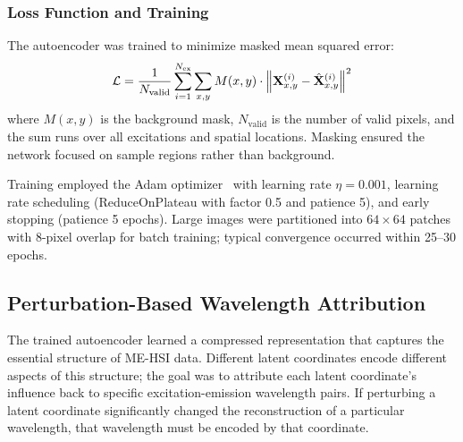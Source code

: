 \subsubsection{Loss Function and Training}
The autoencoder was trained to minimize masked mean squared error:
\begin{equation}
\mathcal{L} = \frac{1}{N_{\text{valid}}} \sum_{i=1}^{N_{\text{ex}}} \sum_{x,y} M(x,y) \cdot \left\| \mathbf{X}^{(i)}_{x,y} - \hat{\mathbf{X}}^{(i)}_{x,y} \right\|^2
\label{eq:loss}
\end{equation}
where $M(x,y)$ is the background mask, $N_{\text{valid}}$ is the number of valid pixels, and the sum runs over all excitations and spatial locations.
Masking ensured the network focused on sample regions rather than background.

Training employed the Adam optimizer~\cite{kingma2014adam} with learning rate $\eta = 0.001$, learning rate scheduling (ReduceOnPlateau with factor 0.5 and patience 5), and early stopping (patience 5 epochs).
Large images were partitioned into $64 \times 64$ patches with 8-pixel overlap for batch training; typical convergence occurred within 25--30 epochs.

\subsection{Perturbation-Based Wavelength Attribution}
\label{sec:perturbation}

The trained autoencoder learned a compressed representation that captures the essential structure of ME-HSI data.
Different latent coordinates encode different aspects of this structure; the goal was to attribute each latent coordinate's influence back to specific excitation-emission wavelength pairs.
If perturbing a latent coordinate significantly changed the reconstruction of a particular wavelength, that wavelength must be encoded by that coordinate.

